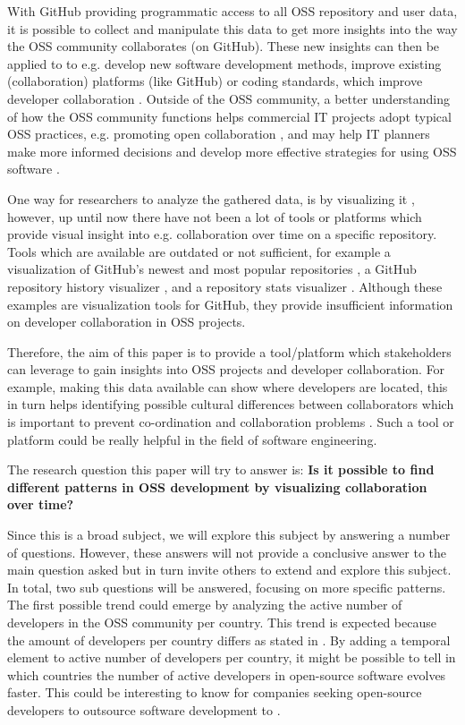 \documentclass[acmtog, authorversion]{acmart}
\begin{document}
With GitHub providing programmatic access to all OSS repository and user data\cite{GHAPI}, it is possible to collect and manipulate this data to get more insights into the way the OSS community collaborates (on GitHub).
These new insights can then be applied to to e.g. develop new software development methods, improve existing (collaboration) platforms (like GitHub) or coding standards, which improve developer collaboration \cite{Jermakovics2013}.
Outside of the OSS community, a better understanding of how the OSS community functions helps commercial IT projects adopt typical OSS practices, e.g. promoting open collaboration \cite{Kalliamvakou:2015:OSC:2818754.2818825}, and may help IT planners make more informed decisions and develop more effective strategies for using OSS software \cite{madey2002}. 

One way for researchers to analyze the gathered data, is by visualizing it \cite{Heller}, however, up until now there have not been a lot of tools or platforms which provide visual insight into e.g. collaboration over time on a specific repository.
Tools which are available are outdated \cite{Heller} or not sufficient, for example a visualization of GitHub's newest and most popular repositories \cite{donnemartin2016}, a GitHub repository history visualizer \cite{artzub2013}, and a repository stats visualizer \cite{bajaj2013}.
Although these examples are visualization tools for GitHub, they provide insufficient information on developer collaboration in OSS projects.

Therefore, the aim of this paper is to provide a tool/platform which stakeholders can leverage to gain insights into OSS projects and developer collaboration.
For example, making this data available can show where developers are located, this in turn helps identifying possible cultural differences between collaborators which is important to prevent co-ordination and collaboration problems \cite{Mishra2014}.
Such a tool or platform could be really helpful in the field of software engineering.

The research question this paper will try to answer is: \textbf{Is it possible to find different patterns in OSS development by visualizing collaboration over time?}

Since this is a broad subject, we will explore this subject by answering a number of questions.
However, these answers will not provide a conclusive answer to the main question asked but in turn invite others to extend and explore this subject.
In total, two sub questions will be answered, focusing on more specific patterns.
The first possible trend could emerge by analyzing the active number of developers in the OSS community per country.
This trend is expected because the amount of developers per country differs as stated in \cite{StackOverflow2017}.
By adding a temporal element to active number of developers per country, it might be possible to tell in which countries the number of active developers in open-source software evolves faster.
This could be interesting to know for companies seeking open-source developers to outsource software development to \cite{haefliger2008code}.
\end{document}
